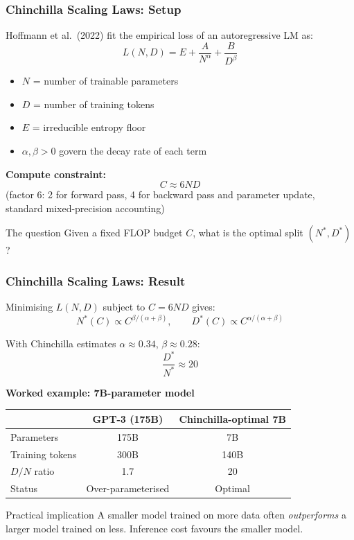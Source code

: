\documentclass[9pt,t]{beamer}
\begin{document}
\begin{frame}
\frametitle{Chinchilla Scaling Laws: Setup}

Hoffmann et al.\ (2022) fit the empirical loss of an autoregressive LM as:
\[
  L(N, D) = E + \frac{A}{N^{\alpha}} + \frac{B}{D^{\beta}}
\]

\begin{itemize}
  \item $N$ = number of trainable parameters
  \item $D$ = number of training tokens
  \item $E$ = irreducible entropy floor
  \item $\alpha, \beta > 0$ govern the decay rate of each term
\end{itemize}

\medskip
\textbf{Compute constraint:}
\[
  C \approx 6ND
\]
(factor 6: 2 for forward pass, 4 for backward pass and parameter update,
standard mixed-precision accounting)

\medskip
\begin{block}{The question}
  Given a fixed FLOP budget $C$, what is the optimal split $(N^*, D^*)$?
\end{block}
\end{frame}

\begin{frame}
\frametitle{Chinchilla Scaling Laws: Result}

Minimising $L(N,D)$ subject to $C = 6ND$ gives:
\[
  N^*(C) \propto C^{\beta/(\alpha+\beta)}, \qquad
  D^*(C) \propto C^{\alpha/(\alpha+\beta)}
\]

With Chinchilla estimates $\alpha \approx 0.34$, $\beta \approx 0.28$:
\[
  \boxed{\frac{D^*}{N^*} \approx 20}
\]

\medskip
\textbf{Worked example: 7B-parameter model}

\medskip
\begin{center}
\begin{tabular}{lcc}
\toprule
 & GPT-3 (175B) & Chinchilla-optimal 7B \\
\midrule
Parameters         & 175B  & 7B \\
Training tokens    & 300B  & 140B \\
$D/N$ ratio        & 1.7   & 20 \\
Status             & Over-parameterised & Optimal \\
\bottomrule
\end{tabular}
\end{center}

\medskip
\begin{alertblock}{Practical implication}
  A smaller model trained on more data often \emph{outperforms} a larger
  model trained on less. Inference cost favours the smaller model.
\end{alertblock}
\end{frame}
\end{document}
